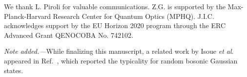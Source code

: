 \documentclass[twocolumn,english,prl,aps,superscriptaddress,amsmath,amssymb,floatfix]{revtex4-2}
\begin{document}
We thank L. Piroli for valuable communications. Z.G. is supported by the Max-Planck-Harvard Research Center for Quantum Optics (MPHQ). J.I.C. acknowledges support by the EU Horizon 2020 program through the ERC Advanced Grant QENOCOBA No. 742102.

\emph{Note added.---}While finalizing this manuscript, a related
work by Isoue \emph{et al}. appeared in Ref.~\cite{Iosue2022}, which reported the %
typicality for random bosonic Gaussian states.





\end{document}
